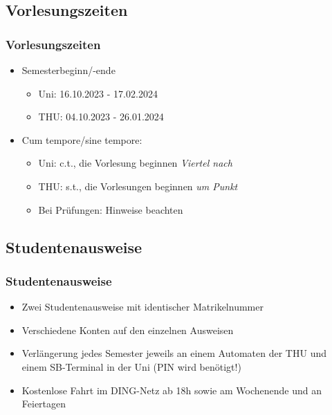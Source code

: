 \documentclass[10pt,a4paper]{beamer}
\begin{document}
    \subsection{Vorlesungszeiten}
    \begin{frame}
        \frametitle{Vorlesungszeiten}
        \vfill
        \begin{itemize}
            \item Semesterbeginn/-ende
            \vfill
            \begin{itemize}
                \item Uni: 16.10.2023 - 17.02.2024
                \vfill
                \item THU: 04.10.2023 - 26.01.2024
            \end{itemize}
            \vfill
            \item Cum tempore/sine tempore:
            \vfill
            \begin{itemize}
                \item Uni: c.t., die Vorlesung beginnen \emph{Viertel nach}
                \vfill
                \item THU: s.t., die Vorlesungen beginnen \emph{um Punkt}
                \vfill
                \item Bei Prüfungen: Hinweise beachten
            \end{itemize}
        \end{itemize}
        \vfill
    \end{frame}


    \subsection{Studentenausweise}
    \begin{frame}
        \frametitle{Studentenausweise}
        \vfill
        \begin{itemize}
            \item Zwei Studentenausweise mit identischer Matrikelnummer
            \vfill
            \item Verschiedene Konten auf den einzelnen Ausweisen
            \vfill
            \item Verlängerung jedes Semester jeweils an einem Automaten der THU und einem SB-Terminal in der Uni (PIN wird benötigt!)
            \vfill
            \item Kostenlose Fahrt im DING-Netz ab 18h sowie am Wochenende und an Feiertagen
        \end{itemize}
        \vfill
    \end{frame}
\end{document}
